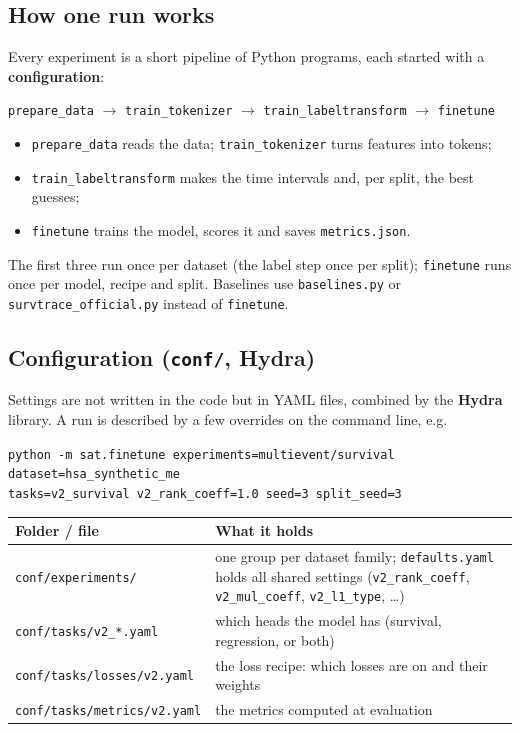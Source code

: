 \documentclass[11pt]{article}
\begin{document}
\subsection{How one run works}
Every experiment is a short pipeline of Python programs, each started with a \textbf{configuration}:
\begin{center}
\texttt{prepare\_data} $\rightarrow$ \texttt{train\_tokenizer} $\rightarrow$
\texttt{train\_labeltransform} $\rightarrow$ \texttt{finetune}
\end{center}
\begin{itemize}
  \item \texttt{prepare\_data} reads the data; \texttt{train\_tokenizer} turns features into tokens;
  \item \texttt{train\_labeltransform} makes the time intervals and, per split, the best guesses;
  \item \texttt{finetune} trains the model, scores it and saves \texttt{metrics.json}.
\end{itemize}
The first three run once per dataset (the label step once per split); \texttt{finetune} runs once per
model, recipe and split. Baselines use \texttt{baselines.py} or \texttt{survtrace\_official.py}
instead of \texttt{finetune}.

\subsection{Configuration (\texttt{conf/}, Hydra)}
Settings are not written in the code but in YAML files, combined by the \textbf{Hydra} library. A run
is described by a few overrides on the command line, e.g.
\begin{center}
\small\texttt{python -m sat.finetune experiments=multievent/survival dataset=hsa\_synthetic\_me}\\
\small\texttt{tasks=v2\_survival v2\_rank\_coeff=1.0 seed=3 split\_seed=3}
\end{center}
\begin{table}[H]
\centering
\small
\begin{tabularx}{\textwidth}{lY}
\toprule
Folder / file & What it holds \\
\midrule
\texttt{conf/experiments/} & one group per dataset family; \texttt{defaults.yaml} holds all shared
  settings (\texttt{v2\_rank\_coeff}, \texttt{v2\_mul\_coeff}, \texttt{v2\_l1\_type}, \dots) \\
\texttt{conf/tasks/v2\_*.yaml} & which heads the model has (survival, regression, or both) \\
\texttt{conf/tasks/losses/v2.yaml} & the loss recipe: which losses are on and their weights \\
\texttt{conf/tasks/metrics/v2.yaml} & the metrics computed at evaluation \\
\bottomrule
\end{tabularx}
\end{table}
\end{document}
